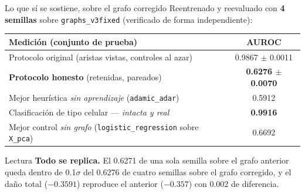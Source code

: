 \begin{frame}{Lo que s\'i se sostiene, sobre el grafo corregido}
  \small
  Reentrenado y reevaluado con \textbf{4 semillas} sobre \texttt{graphs\_v3fixed}
  (verificado de forma independiente):

  \vspace{0.4em}
  \centering
  \begin{tabular}{lc}
    \toprule
    \textbf{Medici\'on (conjunto de prueba)} & \textbf{AUROC} \\
    \midrule
    Protocolo original (aristas vistas, controles al azar) & 0.9867 $\pm$ 0.0011 \\
    \textbf{Protocolo honesto} (retenidas, pareados) & \textbf{0.6276 $\pm$ 0.0070} \\
    Mejor heur\'istica \emph{sin aprendizaje} (\texttt{adamic\_adar}) & 0.5912 \\
    \midrule
    Clasificaci\'on de tipo celular --- \emph{intacta y real} & \textbf{0.9916} \\
    Mejor control \emph{sin grafo} (\texttt{logistic\_regression} sobre \texttt{X\_pca}) & 0.6692 \\
    \bottomrule
  \end{tabular}

  \vspace{0.5em}
  \raggedright
  \begin{block}{Lectura}
    \scriptsize
    \textbf{Todo se replica.} El 0.6271 de una sola semilla sobre el grafo anterior queda
    dentro de 0.1$\sigma$ del 0.6276 de cuatro semillas sobre el grafo corregido, y el
    da\~no total ($-0.3591$) reproduce el anterior ($-0.357$) con 0.002 de diferencia.

    \vspace{0.2em}

    \vspace{0.2em}
  \end{block}
\end{frame}

